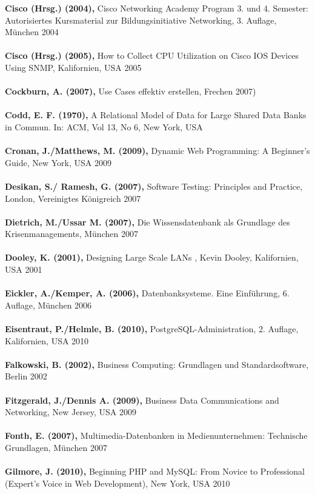 \textbf{Cisco (Hrsg.) (2004),} Cisco Networking Academy Program 3. und 4. Semester: Autorisiertes Kursmaterial zur Bildungsinitiative Networking, 3. Auflage, München 2004\\\\
\textbf{Cisco (Hrsg.) (2005),} How to Collect CPU Utilization on Cisco IOS Devices Using SNMP, Kalifornien, USA 2005\\\\
\textbf{Cockburn, A. (2007),} Use Cases effektiv erstellen, Frechen 2007)\\\\
\textbf{Codd, E. F. (1970),} A Relational Model of Data for Large Shared Data Banks in Commun. In: ACM, Vol 13, No 6, New York, USA\\\\
\textbf{Cronan, J./Matthews, M. (2009),} Dynamic Web Programming: A Beginner's Guide, New York, USA 2009\\\\
\textbf{Desikan, S./ Ramesh, G. (2007),} Software Testing: Principles and Practice, London, Vereinigtes Königreich 2007\\\\
\textbf{Dietrich, M./Ussar M. (2007),} Die Wissensdatenbank als Grundlage des Krisenmanagements, München 2007\\\\
\textbf{Dooley, K. (2001),} Designing Large Scale LANs , Kevin Dooley, Kalifornien, USA 2001\\\\
\textbf{Eickler, A./Kemper, A. (2006),} Datenbanksysteme. Eine Einführung, 6. Auflage, München 2006\\\\
\textbf{Eisentraut, P./Helmle, B. (2010),} PostgreSQL-Administration, 2. Auflage, Kalifornien, USA 2010\\\\
\textbf{Falkowski, B. (2002),} Business Computing: Grundlagen und Standardsoftware, Berlin 2002\\\\
\textbf{Fitzgerald, J./Dennis A. (2009),} Business Data Communications and Networking, New Jersey, USA 2009\\\\
\textbf{Fonth, E. (2007),} Multimedia-Datenbanken in Medienunternehmen: Technische Grundlagen, München 2007\\\\
\textbf{Gilmore, J. (2010),} Beginning PHP and MySQL: From Novice to Professional (Expert's Voice in Web Development), New York, USA 2010\\\\
